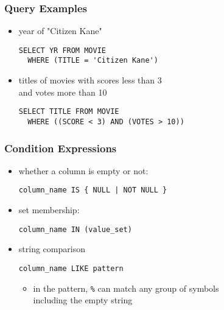 \documentclass[dvipsnames]{beamer}
\theoremstyle{plain}
\begin{document}
\begin{frame}[fragile]
  \frametitle{Query Examples}

  \begin{itemize}
    \item year of "Citizen Kane"
    \begin{lstlisting}
SELECT YR FROM MOVIE
  WHERE (TITLE = 'Citizen Kane')
    \end{lstlisting}

    \pause
    \item titles of movies with scores less than 3\\
      and votes more than 10
    \begin{lstlisting}
SELECT TITLE FROM MOVIE
  WHERE ((SCORE < 3) AND (VOTES > 10))
    \end{lstlisting}
  \end{itemize}
\end{frame}

\begin{frame}[fragile]
  \frametitle{Condition Expressions}

  \begin{itemize}
    \item whether a column is empty or not:\\
    \begin{lstlisting}
column_name IS { NULL | NOT NULL }
    \end{lstlisting}

    \pause
    \item set membership:\\
    \begin{lstlisting}
column_name IN (value_set)
    \end{lstlisting}

    \pause
    \item string comparison
    \begin{lstlisting}
column_name LIKE pattern
    \end{lstlisting}
    \begin{itemize}
      \item in the pattern, \lstinline!%! can match any group of symbols\\
        including the empty string
    \end{itemize}
  \end{itemize}
\end{frame}
\end{document}
